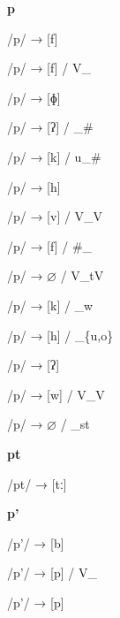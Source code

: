 \begin{center}\textbf{p}\end{center}
\begin{multicols}{4}
\noindent /p/ → [f]

\noindent /p/ → [f] / V\_

\noindent /p/ → [ɸ]

\noindent /p/ → [ʔ] / \_\#

\noindent /p/ → [k] / u\_\#

\noindent /p/ → [h]

\noindent /p/ → [v] / V\_V

\noindent /p/ → [f] / \#\_

\noindent /p/ → $\varnothing$ / V\_tV

\noindent /p/ → [k] / \_w

\noindent /p/ → [h] / \_\{u,o\}

\noindent /p/ → [ʔ]

\noindent /p/ → [w] / V\_V

\noindent /p/ → $\varnothing$ / \_st
\end{multicols}


\begin{center}\textbf{pt}\end{center}
\begin{multicols}{4}
\noindent /pt/ → [tː]
\end{multicols}


\begin{center}\textbf{p'}\end{center}
\begin{multicols}{4}
\noindent /p'/ → [b]

\noindent /p'/ → [p] / V\_

\noindent /p'/ → [p]
\end{multicols}


